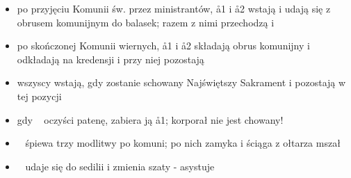 \begin{itemize}
   \item po przyjęciu Komunii św. przez ministrantów, \aa1 i \aa2 wstają i udają
         się z obrusem komunijnym do balasek; razem z nimi przechodzą  i
   \item po skończonej Komunii wiernych, \aa1 i \aa2 składają obrus komunijny i
         odkładają na kredensji i przy niej pozostają
   \item wszyscy wstają, gdy zostanie schowany Najświętszy Sakrament i pozostają
         w tej pozycji
   \item gdy \ii~ oczyści patenę, zabiera ją \aa1; korporał nie jest chowany!
   \item \ii~ śpiewa trzy modlitwy po komuni; po nich  zamyka i ściąga z
         ołtarza mszał
   \item \ii~ udaje się do sedilii i zmienia szaty - asystuje 
\end{itemize}

